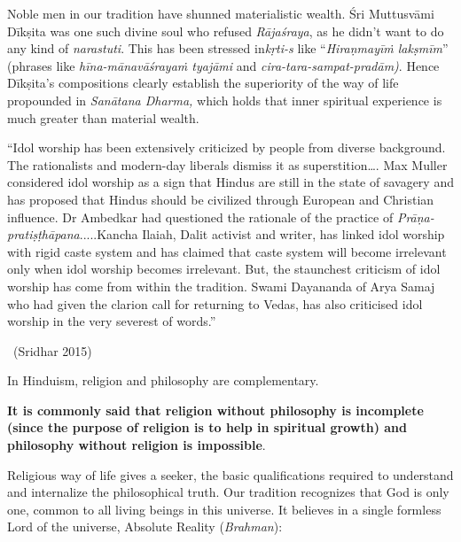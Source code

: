 Noble men in our tradition have shunned materialistic wealth. Śri Muttusvāmi Dīkṣita was one such divine soul who refused \textit{Rājaśraya}, as he didn’t want to do any kind of \textit{narastuti}. This has been stressed in\break \textit{kṛti-s} like “\textit{Hiraṇmayīṁ lakṣmīm}” (phrases like \textit{hīna-mānavāśrayaṁ tyajāmi} and \textit{cira-tara-sampat-pradām)}. Hence Dīkṣita’s compositions clearly establish the superiority of the way of life propounded in \textit{Sanātana Dharma,} which holds that inner spiritual experience is much greater than material wealth.

\begin{myquote}
“Idol worship has been extensively criticized by people from diverse background. The rationalists and modern-day liberals dismiss it as superstition…. Max Muller considered idol worship as a sign that Hindus are still in the state of savagery and has proposed that Hindus should be civilized through European and Christian influence. Dr Ambedkar had questioned the rationale of the practice of \textit{Prāṇa-pratiṣṭhāpana}.....Kancha Ilaiah, Dalit activist and writer, has linked idol worship with rigid caste system and has claimed that caste system will become irrelevant only when idol worship becomes irrelevant. But, the staunchest criticism of idol worship has come from within the tradition. Swami Dayananda of Arya Samaj who had given the clarion call for returning to Vedas, has also criticised idol worship in the very severest of words.” 

~\hfill (Sridhar 2015)
\end{myquote}

In Hinduism, religion and philosophy are complementary.

\textbf{It is commonly said that religion without philosophy is incomplete (since the purpose of religion is to help in spiritual growth) and philosophy without religion is impossible}.

Religious way of life gives a seeker, the basic qualifications required to understand and internalize the philosophical truth. Our tradition recognizes that God is only one, common to all living beings in this universe. It believes in a single formless Lord of the universe, Absolute Reality (\textit{Brahman}):

